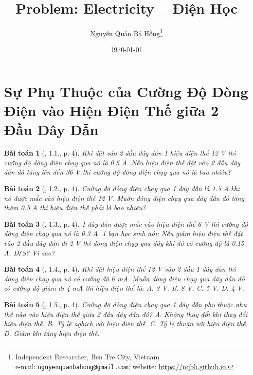 \documentclass{article}
\title{Problem: Electricity -- Điện Học}
\author{Nguyễn Quản Bá Hồng\footnote{Independent Researcher, Ben Tre City, Vietnam\\e-mail: \texttt{nguyenquanbahong@gmail.com}; website: \url{https://nqbh.github.io}.}}
\date{\today}
\newtheorem{baitoan}{Bài toán}
\begin{document}
\maketitle
\begin{abstract}
	
\end{abstract}
\tableofcontents
\newpage


\section{Sự Phụ Thuộc của Cường Độ Dòng Điện vào Hiện Điện Thế giữa 2 Đầu Dây Dẫn}

\begin{baitoan}[\cite{SBT_Vat_Ly_9}, 1.1., p. 4]
	Khi đặt vào 2 đầu dây dẫn 1 hiệu điện thế \emph{12 V} thì cường độ dòng điện chạy qua nó là \emph{0.5 A}. Nếu hiệu điện thế đặt vào 2 đầu dây dẫn đó tăng lên đến \emph{36 V} thì cường độ dòng điện chạy qua nó là bao nhiêu?
\end{baitoan}

\begin{baitoan}[\cite{SBT_Vat_Ly_9}, 1.2., p. 4]
	Cường độ dòng điện chạy qua 1 dây dẫn là \emph{1.5 A} khi nó được mắc vào hiệu điện thế \emph{12 V}. Muốn dòng điện chạy qua dây dẫn đó tăng thêm \emph{0.5 A} thì hiệu điện thế phải là bao nhiêu?
\end{baitoan}

\begin{baitoan}[\cite{SBT_Vat_Ly_9}, 1.3., p. 4]
	1 dây dẫn được mắc vào hiệu điện thế \emph{6 V} thì cường độ dòng điện chạy qua nó là \emph{0.3 A}. 1 bạn học sinh nói: Nếu giảm hiệu điện thế đặt vào 2 đầu dây dẫn đi \emph{2 V} thì dòng điện chạy qua dây khi đó có cường độ là \emph{0.15 A}. \emph{Đ\texttt{/}S?} Vì sao?
\end{baitoan}

\begin{baitoan}[\cite{SBT_Vat_Ly_9}, 1.4., p. 4]
	Khi đặt hiệu điện thế \emph{12 V} vào 2 đầu 1 dây dẫn thì dòng điện chạy qua nó có cường độ \emph{6 mA}. Muốn dòng điện chạy qua dây dẫn đó có cường độ giảm đi \emph{4 mA} thì hiệu điện thế là: {\sf A.} \emph{3 V}. {\sf B.} \emph{8 V}. {\sf C.} \emph{5 V}. {\sf D.} \emph{4 V}.
\end{baitoan}

\begin{baitoan}[\cite{SBT_Vat_Ly_9}, 1.5., p. 4]
	Cường độ dòng điện chạy qua 1 dây dẫn phụ thuộc như thế nào vào hiệu điện thế giữa 2 đầu dây dẫn đó? {\sf A.} Không thay đổi khi thay đổi hiệu điện thế. {\sf B.} Tỷ lệ nghịch với hiệu điện thế. {\sf C.} Tỷ lệ thuận với hiệu điện thế. {\sf D.} Giảm khi tăng hiệu điện thế.
\end{baitoan}
\end{document}
